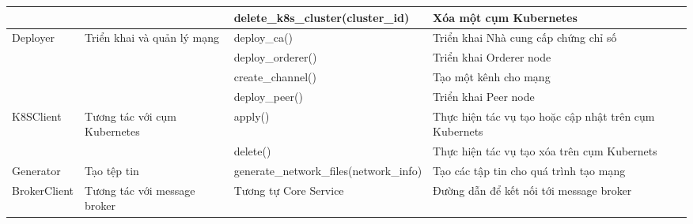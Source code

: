 \documentclass[../DoAn.tex]{subfiles}
\begin{document}
\begin{longtable}{|p{}|p{}|p{}|p{}|}
                                                &                                                                         & delete\_k8s\_cluster\hspace{0pt}(cluster\_id)       & Xóa một cụm Kubernetes                                                    \\ \hline
    \multirow[t]{4}{0.2\textwidth}{Deployer}    & \multirow[t]{4}{0.2\textwidth}{Triển khai và quản lý mạng}              & deploy\_ca()                                        & Triển khai Nhà cung cấp chứng chỉ số                                      \\ \cline{3-4}
                                                &                                                                         & deploy\_orderer()                                   & Triển khai Orderer node                                                   \\ \cline{3-4}
                                                &                                                                         & create\_channel()                                   & Tạo một kênh cho mạng                                                     \\ \cline{3-4}
                                                &                                                                         & deploy\_peer()                                      & Triển khai Peer node                                                      \\ \hline
    \multirow[t]{2}{0.2\textwidth}{K8SClient}   & \multirow[t]{2}{0.2\textwidth}{Tương tác với cụm Kubernetes}            & apply()                                             & Thực hiện tác vụ tạo hoặc cập nhật trên cụm Kubernets                     \\ \cline{3-4}
                                                &                                                                         & delete()                                            & Thực hiện tác vụ tạo xóa trên cụm Kubernets                               \\ \hline
    Generator                                   & Tạo tệp tin                                                             & generate\_network\_files\hspace{0pt}(network\_info) & Tạo các tập tin cho quá trình tạo mạng                                    \\ \hline
    BrokerClient                                & Tương tác với message broker                                            & Tương tự Core Service                              & Đường dẫn để kết nối tới message broker                                   \\ \hline
\end{longtable}
\end{document}
